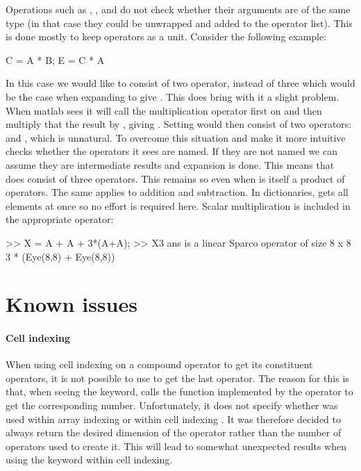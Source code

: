 Operations such as , , and
 do not check whether their arguments are of the
same type (in that case they could be unwrapped and added to the
operator list). This is done mostly to keep operators as a unit.
Consider the following example:
\begin{codeblock}
C = A * B;
E = C * A
\end{codeblock}
In this case we would like  to consist of two operator,
instead of three which would be the case when expanding  to
give .  This does bring with it a slight
problem. When matlab sees  it will call the \spot{}
multiplication operator first on  and then multiply that
the result by , giving . Setting  would then consist of two operators:  and
, which is unnatural. To overcome this situation and make it
more intuitive \spot{} checks whether the operators it sees are
named. If they are not named we can assume they are intermediate
results and expansion is done. This means that  does
consist of three operators. This remains so even when  is
itself a product of operators. The same applies to addition and
subtraction. In dictionaries, \spot{} gets all elements at once so no
effort is required here. Scalar multiplication is included in the
appropriate operator:
\begin{codeblock}
>> X = A + A + 3*(A+A);
>> X{3}
ans is a linear Sparco operator of size 8 x 8
         3 * (Eye(8,8) + Eye(8,8))
\end{codeblock}

\section{Known issues}

\paragraph{Cell indexing} When using cell indexing on a compound
operator to get its constituent operators, it is not possible to use
 to get the last operator. The reason for this is that,
when seeing the  keyword, \matlab{} calls the 
function implemented by the operator to get the corresponding
number. Unfortunately, it does not specify whether  was
used within array indexing \mlcmd{[]} or within cell indexing
\mlcmd{\{\}}. It was therefore decided to always return the desired
dimension of the operator rather than the number of operators used to
create it. This will lead to somewhat unexpected results when using
the  keyword within cell indexing.

